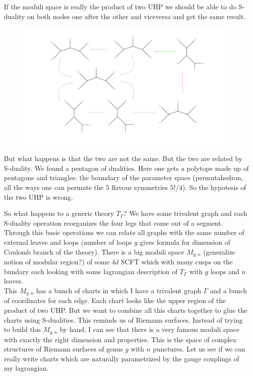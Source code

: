 If the moduli space is really the product of two UHP we should be able to do S-duality on both nodes one after the other and viceversa and get the same result. 
\begin{figure}[H]
\includegraphics[width=\textwidth]{dualities.pdf}
\end{figure}
But what happens is that the two are not the same. But the two are related by S-duality. We found a pentagon of dualities. Here one gets a polytope made up of pentagons and triangles: the boundary of the parameter space (permutahedron, all the ways one can permute the $5$ flavour symmetries $5!/4$). So the hypotesis of the two UHP is wrong.

So what happens to a generic theory $T_{\Gamma}$? We have some trivalent graph and each S-duality operation reorganizes the four legs that come out of a segment. Through this basic operations we can relate all graphs with the same number of external leaves and loops (number of loops $g$ gives formula for dimension of Coulomb branch of the theory). There is a big moduli space $M_{g,n}$ (generalize notion of modular region?) of some $4d$ SCFT which with many cusps on the bundary each looking with some lagrangian description of $T_{\Gamma}$ with $g$ loops and $n$ leaves.\\
This $M_{g,n}$ has a bunch of charts in which I have a trivalent graph $\Gamma$ and a bunch of coordinates for each edge. Each chart looks like the upper region of the product of two UHP. But we want to combine all this charts together to glue the charts using S-dualities. This reminds us of Riemann surfaces. Instead of trying to build this $M_{g,n}$ by hand, I can see that there is a very famous moduli space with exactly the right dimension and properties. This is the space of complex structures of Riemann surfaces of genus $g$ with $n$ punctures. Let us see if we can really write charts which are naturally parametrized by the gauge couplings of my lagrangian.

